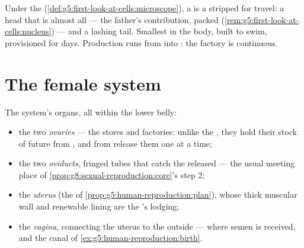 \begin{example}\label{ex:g8:reproductive-systems:sperm}
Under the 
(\cref{def:g5:first-look-at-cells:microscope}), a  is a  stripped for travel: a head that is almost
all  --- the father's contribution, packed
(\cref{rem:g5:first-look-at-cells:nucleus}) --- and a
lashing tail. Smallest  in the body, built to swim,
provisioned for days. Production runs from  into
: the  factory is continuous.
\end{example}

\section{The female system}

\begin{definition}\label{def:g8:reproductive-systems:female}
The  system's organs, all within the lower belly:
\begin{itemize}
  \item the two \emph{ovaries} --- the 
        stores and factories: unlike the , they hold
        their stock of future \emph{} from ,
        and from  release them one at a time;
  \item the two \emph{oviducts}, fringed
        tubes that catch the released  --- the
        usual meeting place of
        \cref{prop:g8:sexual-reproduction:core}'s step 2;
  \item the \emph{uterus} (the  of
        \cref{prop:g5:human-reproduction:plan}), whose
        thick muscular wall and renewable lining are the
        's lodging;
  \item the \emph{vagina}, connecting the uterus to the
        outside --- where semen is received, and the
         canal of \cref{ex:g5:human-reproduction:birth}.
\end{itemize}
\end{definition}

